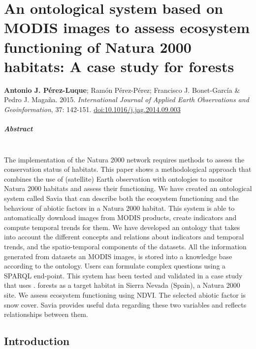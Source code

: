 %
\chapter{An ontological system based on MODIS images to assess ecosystem functioning of Natura 2000 habitats: A case study for \Qp forests}\label{sec:onto}

\mbox{}
\vfill
{\color{ctcolormain}\textbf{Antonio J. Pérez-Luque}}; Ramón Pérez-Pérez; Francisco J. Bonet-García \& Pedro J. Magaña. 2015. \emph{International Journal of Applied Earth Observations and Geoinformation}, 37: 142-151. \href{https://doi.org/10.1016/j.jag.2014.09.003}{doi:10.1016/j.jag.2014.09.003}



\newpage

\paragraph{Abstract} \mbox{} \\
The implementation of the Natura 2000 network requires methods to assess the conservation status of habitats. This paper shows a methodological approach that combines the use of (satellite) Earth observation with ontologies to monitor Natura 2000 habitats and assess their functioning. We have created an ontological system called Savia that can describe both the ecosystem functioning and the behaviour of abiotic factors in a Natura 2000 habitat. This system is able to automatically download images from MODIS products, create indicators and compute temporal trends for them. We have developed an ontology that takes into account the different concepts and relations about indicators and temporal trends, and the spatio-temporal components of the datasets. All the information generated from datasets an MODIS images, is stored into a knowledge base according to the ontology. Users can formulate complex questions using a SPARQL end-point. This system has been tested and validated in a case study that uses \Qpw. forests as a target habitat in Sierra Nevada (Spain), a Natura 2000 site. We assess ecosystem functioning using NDVI. The selected abiotic factor is snow cover. Savia provides useful data regarding these two variables and reflects relationships between them.

\newpage

\section{Introduction}\label{sec:onto:intro}

